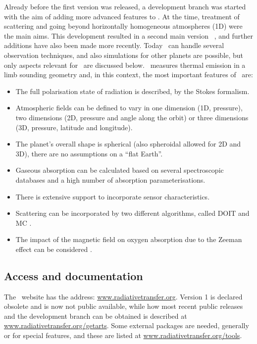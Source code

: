 Already before the first version was released, a development branch was started
with the aim of adding more advanced features to \ARTS. At the time, treatment
of scattering and going beyond horizontally homogeneous atmospheres (1D) were
the main aims. This development resulted in a second main version \ARTS\
\citep{eriksson:arts2:11}, and further additions have also been made more
recently. Today \ARTS\ can handle several observation techniques, and also
simulations for other planets are possible, but only aspects relevant for
\smr\ are discussed below. \smr\ measures thermal emission in a limb sounding
geometry and, in this context, the most important features of \ARTS\ are:
\begin{itemize}
\item The full polarisation state of radiation is described, by the Stokes
  formalism.
\item Atmospheric fields can be defined to vary in one dimension (1D,
  pressure), two dimensions (2D, pressure and angle along the orbit) or three
  dimensions (3D, pressure, latitude and longitude).
\item The planet's overall shape is spherical (also spheroidal allowed for 2D
  and 3D), there are no assumptions on a ``flat Earth''.
\item Gaseous absorption can be calculated based on several spectroscopic
  databases and a high number of absorption parameterisations.
\item There is extensive support to incorporate sensor characteristics.
\item Scattering can be incorporated by two different algorithms, called DOIT
  \citep{emde:apoli:04} and MC \citep{davisetal:04}.
\item The impact of the magnetic field on oxygen absorption due to the Zeeman
  effect can be considered \citep{larsson:zeema:14}.
\end{itemize}



\subsection{Access and documentation}
%
The \ARTS\ website has the address: \url{www.radiativetransfer.org}. Version 1
is declared obsolete and is now not public available, while how most recent
public releases and the development branch can be obtained is described at
\url{www.radiativetransfer.org/getarts}. Some external packages are needed,
generally or for special features, and these are listed at
\url{www.radiativetransfer.org/tools}.

